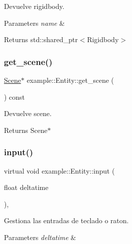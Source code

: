 Devuelve rigidbody. 


\begin{DoxyParams}{Parameters}
{\em name} & \\
\hline
\end{DoxyParams}
\begin{DoxyReturn}{Returns}
std\+::shared\+\_\+ptr$<$\+Rigidbody$>$ 
\end{DoxyReturn}
\mbox{\label{classexample_1_1_entity_a6d32a518949bb42bed3d13377c2ab7ad}} 
\subsubsection{\texorpdfstring{get\_scene()}{get\_scene()}}
{\footnotesize\ttfamily \mbox{\hyperlink{classexample_1_1_scene}{Scene}}$\ast$ example\+::\+Entity\+::get\+\_\+scene (\begin{DoxyParamCaption}{ }\end{DoxyParamCaption}) const\hspace{0.3cm}{\ttfamily [inline]}}



Devuelve scene. 

\begin{DoxyReturn}{Returns}
Scene$\ast$ 
\end{DoxyReturn}
\mbox{\label{classexample_1_1_entity_a8e2ffc6208151f9d60b7c98d04f12de2}} 
\subsubsection{\texorpdfstring{input()}{input()}}
{\footnotesize\ttfamily virtual void example\+::\+Entity\+::input (\begin{DoxyParamCaption}\item[{float}]{deltatime }\end{DoxyParamCaption})\hspace{0.3cm}{\ttfamily [inline]}, {\ttfamily [virtual]}}



Gestiona las entradas de teclado o raton. 


\begin{DoxyParams}{Parameters}
{\em deltatime} & \\
\hline
\end{DoxyParams}


